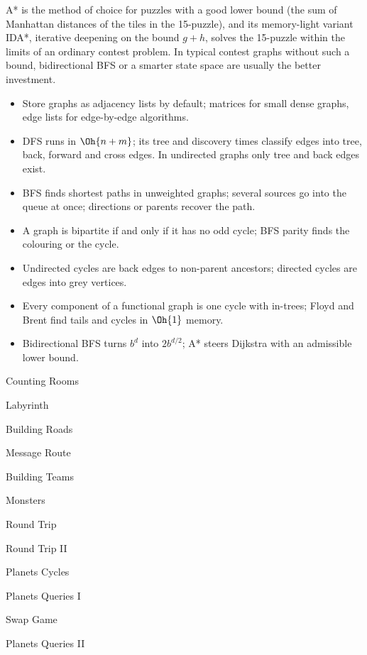 A* is the method of choice for puzzles with a good lower bound (the sum of Manhattan distances of the tiles in the 15-puzzle),
and its memory-light variant IDA*, iterative deepening on the bound $g + h$, solves the 15-puzzle within the limits of an
ordinary contest problem. In typical contest graphs without such a bound, bidirectional BFS or a smarter state space are
usually the better investment.

\begin{summary}
\begin{itemize}
  \item Store graphs as adjacency lists by default; matrices for small dense graphs, edge lists for edge-by-edge algorithms.
  \item DFS runs in $\Oh{n + m}$; its tree and discovery times classify edges into tree, back, forward and cross edges. In
        undirected graphs only tree and back edges exist.
  \item BFS finds shortest paths in unweighted graphs; several sources go into the queue at once; directions or parents
        recover the path.
  \item A graph is bipartite if and only if it has no odd cycle; BFS parity finds the colouring or the cycle.
  \item Undirected cycles are back edges to non-parent ancestors; directed cycles are edges into grey vertices.
  \item Every component of a functional graph is one cycle with in-trees; Floyd and Brent find tails and cycles in
        $\Oh{1}$ memory.
  \item Bidirectional BFS turns $b^d$ into $2b^{d/2}$; A* steers Dijkstra with an admissible lower bound.
\end{itemize}
\end{summary}

\begin{practice}
\begin{pplist}
  \item Counting Rooms
  \item Labyrinth
  \item Building Roads
  \item Message Route
  \item Building Teams
  \item Monsters
\end{pplist}
\begin{pplist}
  \item Round Trip
  \item Round Trip II
  \item Planets Cycles
  \item Planets Queries I
  \item Swap Game
  \item Planets Queries II
\end{pplist}
\end{practice}

